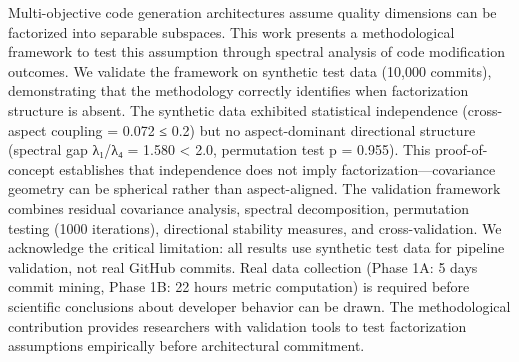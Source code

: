 
Multi-objective code generation architectures assume quality dimensions can be factorized into separable subspaces. This work presents a methodological framework to test this assumption through spectral analysis of code modification outcomes. We validate the framework on synthetic test data (10,000 commits), demonstrating that the methodology correctly identifies when factorization structure is absent. The synthetic data exhibited statistical independence (cross-aspect coupling = 0.072 ≤ 0.2) but no aspect-dominant directional structure (spectral gap λ₁/λ₄ = 1.580 < 2.0, permutation test p = 0.955). This proof-of-concept establishes that independence does not imply factorization—covariance geometry can be spherical rather than aspect-aligned. The validation framework combines residual covariance analysis, spectral decomposition, permutation testing (1000 iterations), directional stability measures, and cross-validation. We acknowledge the critical limitation: all results use synthetic test data for pipeline validation, not real GitHub commits. Real data collection (Phase 1A: 5 days commit mining, Phase 1B: 22 hours metric computation) is required before scientific conclusions about developer behavior can be drawn. The methodological contribution provides researchers with validation tools to test factorization assumptions empirically before architectural commitment.
